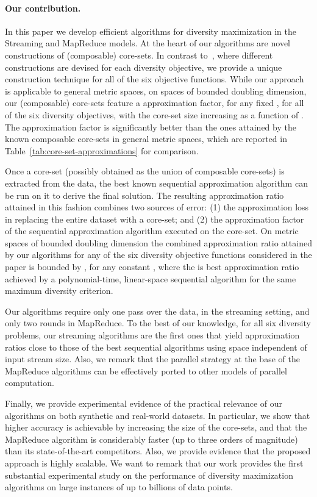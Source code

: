 \documentclass{article}
\begin{document}
\paragraph{Our contribution.}
In this paper we develop efficient algorithms for diversity
maximization in the Streaming and MapReduce models.  At the heart of
our algorithms are novel constructions of (composable) core-sets.
In contrast to~\cite{IndykMMM14, AghamolaeiFZ15}, where
different constructions are devised for each diversity objective, we
provide a unique construction technique for all of the six objective
functions.  While our approach is applicable to general metric spaces,
on spaces of bounded doubling dimension, our (composable) core-sets
feature a  approximation factor, for any fixed
, for all of the six diversity objectives, with the
core-set size increasing as a function of
. The approximation factor is significantly better than
the ones attained by the known composable core-sets in general metric
spaces, which are reported in Table~\ref{tab:core-set-approximations}
for comparison.

Once a core-set (possibly obtained as the union of composable
core-sets) is extracted from the data, the best known sequential
approximation algorithm can be run on it to derive the final
solution. The resulting approximation ratio attained in this fashion
combines two sources of error: (1) the approximation loss in replacing
the entire dataset with a core-set; and (2) the approximation factor
of the sequential approximation algorithm executed on the core-set.
On metric spaces of bounded doubling dimension the combined
approximation ratio attained by our algorithms for any of the six
diversity objective functions considered in the paper is bounded by
, for any constant , where
 the is best approximation ratio achieved by a
polynomial-time, linear-space sequential algorithm for the same
maximum diversity criterion.

Our algorithms require only one pass over the data, in the streaming
setting, and only two rounds in MapReduce. To the best of our
knowledge, for all six diversity problems, our streaming algorithms
are the first ones that yield approximation ratios close to those of
the best sequential algorithms using space independent of input stream
size. Also, we remark that the parallel strategy at the base of the
MapReduce algorithms can be effectively ported to other models of
parallel computation.

Finally, we provide experimental evidence of the practical relevance
of our algorithms on both synthetic and real-world datasets. In
particular, we show that higher accuracy is achievable by increasing
the size of the core-sets, and that the MapReduce algorithm is
considerably faster (up to three orders of magnitude) than its
state-of-the-art competitors.  Also, we provide evidence that the
proposed approach is highly scalable. We want to remark that our work
provides the first substantial experimental study on the performance
of diversity maximization algorithms on large instances of up to
billions of data points.
\end{document}
